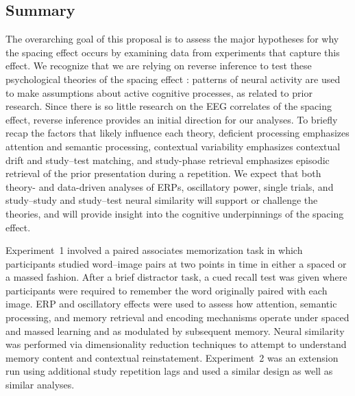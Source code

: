 
\subsection{Summary}


The overarching goal of this proposal is to assess the major hypotheses for why the spacing effect occurs by examining data from experiments that capture this effect.
We recognize that we are relying on reverse inference to test these psychological theories of the spacing effect \cite{Pold2006,PoldWagn2004}: patterns of neural activity are used to make assumptions about active cognitive processes, as related to prior research.  Since there is so little research on the EEG correlates of the spacing effect, reverse inference provides an initial direction for our analyses.
To briefly recap the factors that likely influence each theory, deficient processing emphasizes attention and semantic processing, contextual variability emphasizes contextual drift and study--test matching, and study-phase retrieval emphasizes episodic retrieval of the prior presentation during a repetition.
We expect that both theory- and data-driven analyses of ERPs, oscillatory power, single trials, and study--study and study--test neural similarity will support or challenge the theories, and will provide insight into the cognitive underpinnings of the spacing effect.

Experiment~1 involved a paired associates memorization task in which participants studied word--image pairs at two points in time in either a spaced or a massed fashion.  After a brief distractor task, a cued recall test was given where participants were required to remember the word originally paired with each image.
ERP and oscillatory effects were used to assess how attention, semantic processing, and memory retrieval and encoding mechanisms operate under spaced and massed learning and as modulated by subsequent memory.  Neural similarity was performed via dimensionality reduction techniques to attempt to understand memory content and contextual reinstatement.
Experiment~2 was an extension run using additional study repetition lags and used a similar design as well as similar analyses.

